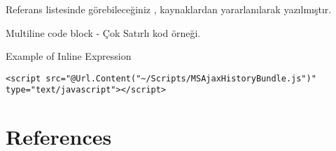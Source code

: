 \documentclass[10pt,a4paper,draft]{article}
\begin{document}
Referans listesinde görebileceğiniz \cite{Haack2011},\cite{Haley2010} kaynaklardan
yararlanılarak yazılmıştır.




Multiline code block - Çok Satırlı kod örneği.










Example of Inline Expression

\begin{lstlisting}
<script src="@Url.Content("~/Scripts/MSAjaxHistoryBundle.js")" type="text/javascript"></script>
\end{lstlisting}






\section*{References}





% 

\end{document}
